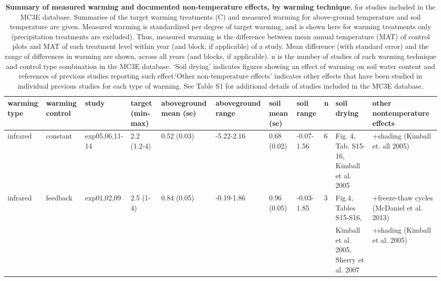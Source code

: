 \documentclass{article}
\begin{document}
\begin{landscape}

\begin{table}[ht]
\centering
\caption{\textbf{Summary of measured warming and documented non-temperature effects, by warming technique}, for studies included in the MC3E database. Summaries of the target warming treatments (\degree C) and measured warming for above-ground temperature and soil temperature are given. Measured warming is standardized per degree of target warming, and is shown here for warming treatments only (precipitation treatments are excluded). Thus, measured warming is the difference between mean annual temperature (MAT) of control plots and MAT of each treatment level within year (and block, if applicable) of a study. Mean difference (with standard error) and the range of differences in warming are shown, across all years (and blocks, if applicable). n is the number of studies of each warming technique and control type combination in the MC3E database. `Soil drying' indicates figures showing an effect of warming on soil water content and references of previous studies reporting such effect.`Other non-temperature effects' indicates other effects that have been studied in individual previous studies for each type of warming. See Table S1 for additional details of studies included in the MC3E database.} 
\label{tab:warmtech}
\begingroup\footnotesize
\begin{tabular}{|p{}|p{}|p{}|p{}|p{}|p{}|p{}|p{}|p{}|p{}|p{}|}
  \hline
warming type & warming control & study & target (min-max) & aboveground mean (se) & aboveground range & soil mean (se) & soil range & n & soil drying & other nontemperature effects \\ 
  \hline
infrared & constant & exp05,06,11-14 & 2.2 (1.2-4) & 0.52 (0.03) & -5.22-2.16 & 0.68 (0.02) & -0.07-1.56 & 6 & Fig. 4, Tab. S15-16, Kimball et al. 2005 & +shading (Kimball et. all 2005) \\ 
   \hline
infrared & feedback & exp01,02,09 & 2.5 (1-4) & 0.84 (0.05) & -0.19-1.86 & 0.96 (0.05) & -0.03-1.85 & 3 & Fig.4, Tables S15-S16,  & +freeze-thaw cycles (McDaniel et al. 2013) \\ 
   &  &  &  &  &  &  &  &  & Kimball et al. 2005, Sherry et al. 2007 & +shading (Kimball et al. 2005) \\ 

\end{tabular}
\end{table}
\end{landscape}
\end{document}

